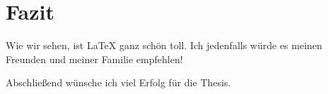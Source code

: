 
\newpage
\section{Fazit}
Wie wir sehen, ist \LaTeX{} ganz schön toll. Ich jedenfalls würde es meinen Freunden und meiner Familie empfehlen!

Abschließend wünsche ich viel Erfolg für die Thesis.
